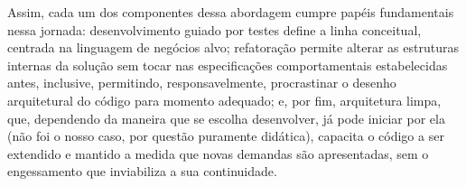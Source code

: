     Assim, cada um dos componentes dessa abordagem cumpre papéis fundamentais nessa jornada: desenvolvimento guiado por testes define a linha conceitual, centrada na linguagem de negócios alvo; refatoração permite alterar as estruturas internas da solução sem tocar nas especificações comportamentais estabelecidas antes, inclusive, permitindo, responsavelmente, procrastinar o desenho arquitetural do código para momento adequado; e, por fim, arquitetura limpa, que, dependendo da maneira que se escolha desenvolver, já pode iniciar por ela (não foi o nosso caso, por questão puramente didática), capacita o código a ser extendido e mantido a medida que novas demandas são apresentadas, sem o engessamento que inviabiliza a sua continuidade.

  \clearpage

  \renewcommand\refname{Referências}

    
    


